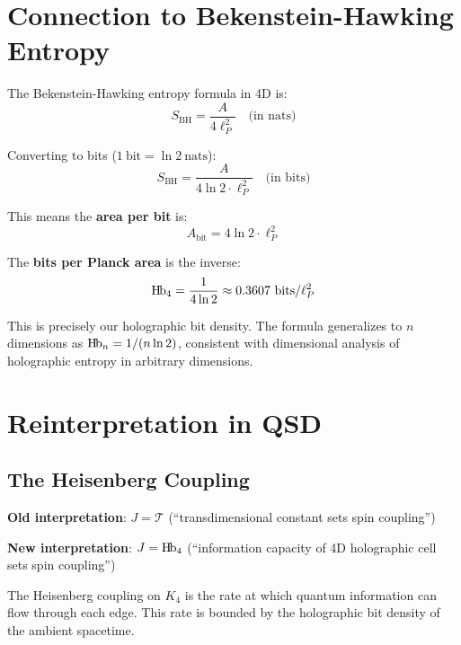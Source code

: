 \documentclass[11pt,a4paper]{article}
\newcommand{\Hb}{\textnormal{H\kern-0.12em b}}
\newcommand{\Hbn}{\Hb_n}
\newcommand{\Hbfour}{\Hb_4}
\newcommand{\Tc}{\mathcal{T}}
\newcommand{\lp}{\ell_P}
\begin{document}
\section{Connection to Bekenstein-Hawking Entropy}
\label{sec:BH}

The Bekenstein-Hawking entropy formula in 4D is:
\begin{equation}
S_{\text{BH}} = \frac{A}{4\lp^2} \quad \text{(in nats)}
\end{equation}

Converting to bits ($1~\text{bit} = \ln 2~\text{nats}$):
\begin{equation}
S_{\text{BH}} = \frac{A}{4\ln 2 \cdot \lp^2} \quad \text{(in bits)}
\end{equation}

This means the \textbf{area per bit} is:
\begin{equation}
A_{\text{bit}} = 4\ln 2 \cdot \lp^2
\end{equation}

The \textbf{bits per Planck area} is the inverse:
\begin{equation}
\Hbfour = \frac{1}{4\ln 2} \approx 0.3607~\text{bits}/\lp^2
\end{equation}

This is precisely our holographic bit density. The formula generalizes to $n$ dimensions as $\Hbn = 1/(n\ln 2)$, consistent with dimensional analysis of holographic entropy in arbitrary dimensions.

\section{Reinterpretation in QSD}
\label{sec:qsd}

\subsection{The Heisenberg Coupling}

\textbf{Old interpretation}: $J = \Tc$ (``transdimensional constant sets spin coupling'')

\textbf{New interpretation}: $J = \Hbfour$ (``information capacity of 4D holographic cell sets spin coupling'')

The Heisenberg coupling on $K_4$ is the rate at which quantum information can flow through each edge. This rate is bounded by the holographic bit density of the ambient spacetime.
\end{document}
